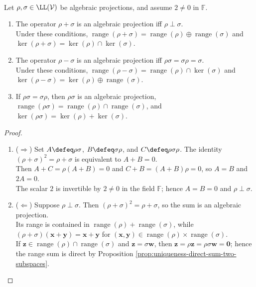 \begin{theorem} \label{thm:algebra-of-projections} \\
Let $\rho,\sigma\in\LL(\mathcal{V})$ be algebraic projections, and assume $2\neq0$ in $\mathbb{F}$.
\begin{enumerate}[label=(\roman*)]
\setlength{\itemsep}{0pt}
\item The operator $\rho+\sigma$ is an algebraic projection iff $\rho\perp\sigma$.\\
Under these conditions, $\operatorname{range}(\rho+\sigma)=\operatorname{range}(\rho)\oplus\operatorname{range}(\sigma)$ and $\ker(\rho+\sigma)=\ker(\rho)\cap\ker(\sigma)$.
\item The operator $\rho-\sigma$ is an algebraic projection iff $\rho\sigma=\sigma\rho=\sigma$.\\
Under these conditions, $\operatorname{range}(\rho-\sigma)=\operatorname{range}(\rho)\cap\ker(\sigma)$ and $\ker(\rho-\sigma)=\ker(\rho)\oplus\operatorname{range}(\sigma)$.
\item If $\rho\sigma=\sigma\rho$, then $\rho\sigma$ is an algebraic projection, $\operatorname{range}(\rho\sigma)=\operatorname{range}(\rho)\cap\operatorname{range}(\sigma)$, and $\ker(\rho\sigma)=\ker(\rho)+\ker(\sigma)$.
\end{enumerate}
\begin{proof}
\begin{enumerate}[label=(\roman*)]
\setlength{\itemsep}{0pt}
\item[$(i)$] ($\Rightarrow$) Set $A\defeq\rho\sigma$, $B\defeq\sigma\rho$, and $C\defeq\rho\sigma\rho$. The identity $(\rho+\sigma)^2=\rho+\sigma$ is equivalent to $A+B=0$.\\
Then $A+C=\rho(A+B)=0$ and $C+B=(A+B)\rho=0$, so $A=B$ and $2A=0$.\\
The scalar $2$ is invertible by $2\neq0$ in the field $\mathbb{F}$; hence $A=B=0$ and $\rho\perp\sigma$.
\item[$(i)$] ($\Leftarrow$) Suppose $\rho\perp\sigma$. Then $(\rho+\sigma)^2=\rho+\sigma$, so the sum is an algebraic projection.\\
Its range is contained in $\operatorname{range}(\rho)+\operatorname{range}(\sigma)$, while $(\rho+\sigma)(\mathbf{x}+\mathbf{y})=\mathbf{x}+\mathbf{y}$ for $(\mathbf{x},\mathbf{y})\in\operatorname{range}(\rho)\times\operatorname{range}(\sigma)$.\\
If $\mathbf{z}\in\operatorname{range}(\rho)\cap\operatorname{range}(\sigma)$ and $\mathbf{z}=\sigma\mathbf{w}$, then $\mathbf{z}=\rho\mathbf{z}=\rho\sigma\mathbf{w}=\mathbf{0}$; hence the range sum is direct by Proposition \ref{prop:uniqueness-direct-sum-two-subspaces}.\\

\end{enumerate}
\end{proof}
\end{theorem}
